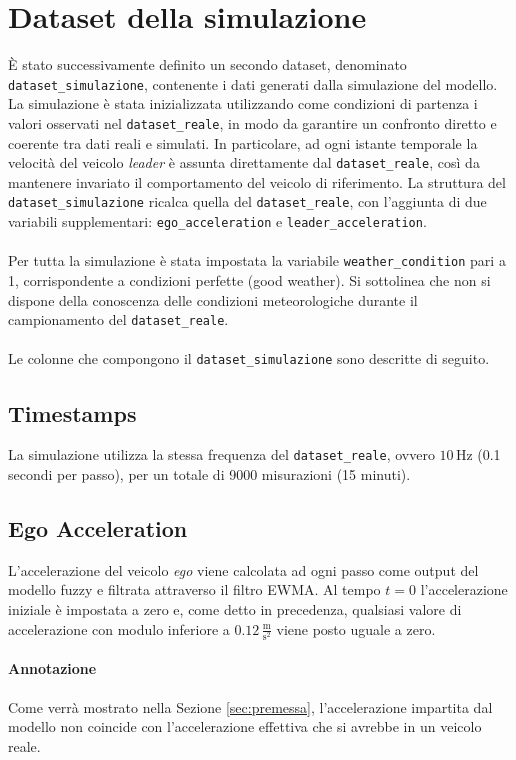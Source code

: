 \section{Dataset della simulazione}
\noindent È stato successivamente definito un secondo dataset, denominato \texttt{dataset\_simulazione}, 
contenente i dati generati dalla simulazione del modello.  
La simulazione è stata inizializzata utilizzando come condizioni di partenza i valori osservati nel \texttt{dataset\_reale}, 
in modo da garantire un confronto diretto e coerente tra dati reali e simulati.  
In particolare, ad ogni istante temporale la velocità del veicolo \emph{leader} è assunta direttamente dal \texttt{dataset\_reale}, 
così da mantenere invariato il comportamento del veicolo di riferimento.  
La struttura del \texttt{dataset\_simulazione} ricalca quella del \texttt{dataset\_reale}, 
con l'aggiunta di due variabili supplementari: \texttt{ego\_acceleration} e \texttt{leader\_acceleration}. 
\\\\
\noindent Per tutta la simulazione è stata impostata la variabile \texttt{weather\_condition} pari a 1, 
corrispondente a condizioni perfette (good weather).   
Si sottolinea che non si dispone della conoscenza delle condizioni meteorologiche durante il 
campionamento del \texttt{dataset\_reale}.
\\\\
Le colonne che compongono il \texttt{dataset\_simulazione} sono descritte di seguito.

\subsection{Timestamps}
La simulazione utilizza la stessa frequenza del \texttt{dataset\_reale}, 
ovvero $10\,\mathrm{Hz}$ (0.1 secondi per passo), per un totale di 9000 misurazioni (15 minuti).

\subsection{Ego Acceleration}
\label{subsec:ego_acceleration}
L'accelerazione del veicolo \emph{ego} viene calcolata ad ogni passo come output del modello fuzzy e filtrata attraverso il filtro EWMA.  
Al tempo $t=0$ l'accelerazione iniziale è impostata a zero e, come detto in precedenza, qualsiasi valore di accelerazione con modulo
inferiore a $0.12 \,\frac{\mathrm{m}}{\mathrm{s^2}}$ viene posto uguale a zero.

\paragraph{Annotazione} Come verrà mostrato nella Sezione \ref{sec:premessa}, 
l'accelerazione impartita dal modello non coincide con l'accelerazione effettiva che si avrebbe in un veicolo reale.  

